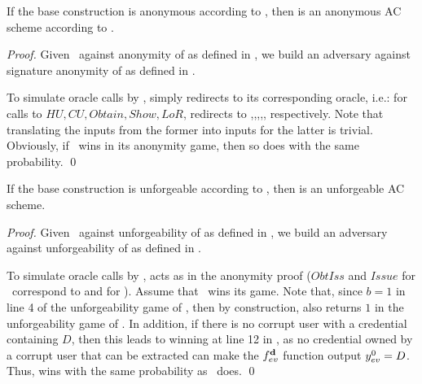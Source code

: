 \begin{theorem}
  \label{thm:anon-cuasac}
  If the base \CUASGen construction is anonymous according to
  , then \CUASAC is an anonymous AC scheme
  according to \cite{fhs19}.
\end{theorem}

\begin{proof}
  Given \adv~against anonymity of \CUASAC as defined in \cite{fhs19}, we build
  an adversary \advB against signature anonymity of \CUASGen as defined
  in .

  To simulate oracle calls by \adv, \advB simply redirects to its corresponding
  oracle, i.e.: for calls to $HU,CU,Obtain,Show,LoR$, \advB redirects to
  \HUGEN,\CUGEN,\OBTAIN,\SIGN,\CHALb, respectively. Note that translating
  the inputs from the former into inputs for the latter is trivial.
  Obviously, if \adv~wins in its anonymity game, then so does \advB with the
  same probability.
  \qed
\end{proof}

\begin{theorem}
  \label{thm:forge-cuasac}
  If the base \CUASGen construction is unforgeable according to
  , then \CUASAC is an unforgeable AC scheme.
\end{theorem}

\begin{proof}
  Given \adv~against unforgeability of \CUASAC as defined in \cite{fhs19}, we
  build an adversary \advB against unforgeability of \CUASGen as defined in
  .

  To simulate oracle calls by \adv, \advB acts as in the anonymity proof
  ($ObtIss$ and $Issue$ for \adv~correspond to \OBTISS and \ISSUE for \advB).
  Assume that \adv~wins its game. Note that, since $b=1$ in line 4 of the
  unforgeability game of , then by construction, \Verify
  also returns $1$ in the unforgeability game of \UAS. In addition, if
  there is no corrupt user with a credential containing $D$, then this leads to
  \advB winning at line 12 in , as no credential
  owned by a corrupt user that can be extracted can make the $f_{ev}^{\mathbf{d}}$
  function output $y_{ev}^0=D$. Thus, \advB wins with the same probability as
  \adv~does.  
  \qed
\end{proof}

